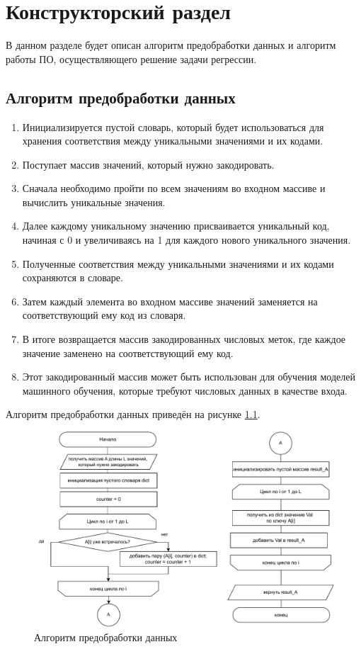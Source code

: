 \chapter{Конструкторский раздел}
    
В данном разделе будет описан алгоритм предобработки данных и алгоритм работы ПО, осуществляющего решение задачи регрессии.

\section{Алгоритм предобработки данных}
\begin{enumerate}
    \item Инициализируется пустой словарь, который будет использоваться для хранения соответствия между уникальными значениями и их кодами.
    \item Поступает массив значений, который нужно закодировать.
    \item Сначала необходимо пройти по всем значениям во входном массиве и вычислить уникальные значения.
    \item Далее каждому уникальному значению присваивается уникальный код, начиная с 0 и увеличиваясь на 1 для каждого нового уникального значения.
    \item Полученные соответствия между уникальными значениями и их кодами сохраняются в словаре.
    \item Затем каждый элемента во входном массиве значений заменяется на соответствующий ему код из словаря.
    \item В итоге возвращается массив закодированных числовых меток, где каждое значение заменено на соответствующий ему код.
    \item Этот закодированный массив может быть использован для обучения моделей машинного обучения, которые требуют числовых данных в качестве входа.
\end{enumerate}
Алгоритм предобработки данных приведён на рисунке \ref{fig:prep}.
\newpage
\begin{figure}[h!]
	\centering
	\includegraphics[width = \linewidth]{img/prep.pdf}
	\caption{Алгоритм предобработки данных}
	\label{fig:prep}
\end{figure}

